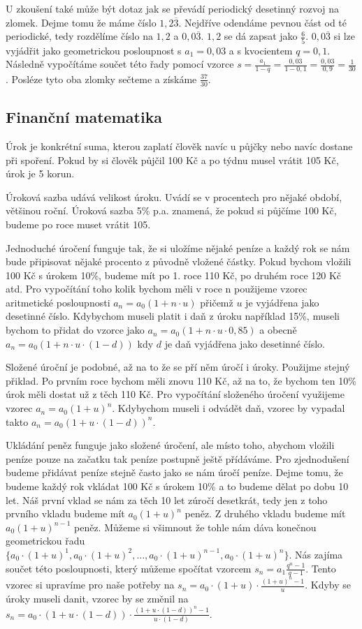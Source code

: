 \documentclass[12pt]{article}
\begin{document}
U zkoušení také může být dotaz jak se převádí periodický desetinný rozvoj na zlomek. Dejme tomu že
máme číslo $1,2\overline{3}$. Nejdříve odendáme pevnou část od té periodické, tedy rozdělíme číslo
na $1,2$ a $0,0\overline{3}$. $1,2$ se dá zapsat jako $\frac{6}{5}$. $0,0\overline{3}$ si lze vyjádřit
jako geometrickou posloupnost s $a_1 = 0,03$ a s kvocientem $q = 0,1$. Následně vypočítáme součet
této řady pomocí vzorce $s = \frac{a_1}{1-q} = \frac{0,03}{1-0,1} = \frac{0,03}{0,9} = \frac{1}{30}$.
Posléze tyto oba zlomky sečteme a získáme $\frac{37}{30}$.

\subsection*{Finanční matematika}

Úrok je konkrétní suma, kterou zaplatí člověk navíc u půjčky nebo navíc dostane při spoření. Pokud by
si člověk půjčil 100 Kč a po týdnu musel vrátit 105 Kč, úrok je 5 korun.

Úroková sazba udává velikost úroku. Uvádí se v procentech pro nějaké období, většinou roční. Úroková
sazba 5\% p.a. znamená, že pokud si půjčíme 100 Kč, budeme po roce muset vrátit 105.

Jednoduché úročení funguje tak, že si uložíme nějaké peníze a každý rok se nám bude připisovat nějaké
procento z původně vložené částky. Pokud bychom vložili 100 Kč s úrokem 10\%, budeme mít po 1. roce
110 Kč, po druhém roce 120 Kč atd. Pro vypočítání toho kolik bychom měli v roce n použijeme vzorec
aritmetické posloupnosti $a_n = a_0(1 + n \cdot u)$ přičemž $u$ je vyjádřena jako desetinné číslo.
Kdybychom museli platit i daň z úroku například 15\%, museli bychom to přidat do vzorce jako
$a_n = a_0(1 + n \cdot u \cdot 0,85)$ a obecně $a_n = a_0(1 + n \cdot u \cdot (1 - d))$ kdy $d$ je
daň vyjádřena jako desetinné číslo.

Složené úroční je podobné, až na to že se pří něm úročí i úroky. Použijme stejný přiklad. Po prvním
roce bychom měli znovu 110 Kč, až na to, že bychom ten 10\% úrok měli dostat už z těch 110 Kč. 
Pro vypočítání složeného úročení využijeme vzorec $a_n = a_0(1 + u)^n$. Kdybychom museli i
odvádět daň, vzorec by vypadal takto $a_n = a_0(1 + u \cdot (1 - d))^n$.

Ukládání peněz funguje jako složené úročení, ale místo toho, abychom vložili peníze pouze na
začatku tak peníze postupně ještě přídáváme. Pro zjednodušení budeme přidávat peníze stejně často
jako se nám úročí peníze. Dejme tomu, že budeme každý rok vkládat 100 Kč s úrokem 10\% a to budeme
dělat po dobu 10 let. Náš první vklad se nám za těch 10 let zúročí desetkrát, tedy jen z toho
prvního vkladu budeme mít $a_0(1 + u)^n$ peněz. Z druhého vkladu budeme mít $a_0(1 + u)^{n-1}$ peněz.
Můžeme si všimnout že tohle nám dáva konečnou geometrickou řadu $\{a_0 \cdot (1 + u)^1, a_0 \cdot
(1 + u)^2, \dots, a_0 \cdot (1 + u)^{n-1}, a_0 \cdot (1 + u)^n\}$. Nás zajíma součet této
posloupnosti,
který můžeme spočítat vzorcem $s_n = a_1\frac{q^n - 1}{q - 1}$. Tento vzorec si upravíme pro naše
potřeby na $s_n = a_0 \cdot (1 + u) \cdot \frac{(1 + u)^n - 1}{u}$. Kdyby se úroky museli danit,
vzorec by se změnil na $s_n = a_0 \cdot (1 + u \cdot (1 - d)) \cdot \frac{(1 + u \cdot (1 - d))^n - 1}
{u \cdot (1 - d)}$.
\end{document}
